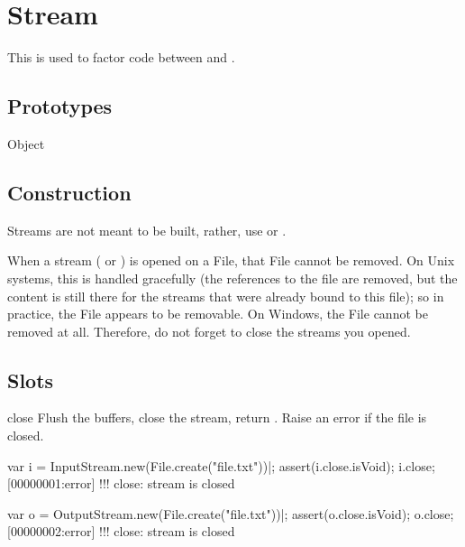 
\section{Stream}

This is used to factor code between  and
.

\subsection{Prototypes}
\begin{refObjects}
\item[Object]
\end{refObjects}

\subsection{Construction}
\label{sec:specs:Stream:ctor}

Streams are not meant to be built, rather, use  or
.

When a stream ( or ) is
opened on a File, that File cannot be removed.  On Unix systems, this is
handled gracefully (the references to the file are removed, but the content
is still there for the streams that were already bound to this file); so in
practice, the File appears to be removable.  On Windows, the File cannot be
removed at all.  Therefore, do not forget to close the streams you opened.

\subsection{Slots}

\begin{urbiscriptapi}
\item[close] Flush the buffers, close the stream, return .
  Raise an error if the file is closed.
\begin{urbiscript}
var i = InputStream.new(File.create("file.txt"))|;
assert(i.close.isVoid);
i.close;
[00000001:error] !!! close: stream is closed

var o = OutputStream.new(File.create("file.txt"))|;
assert(o.close.isVoid);
o.close;
[00000002:error] !!! close: stream is closed
\end{urbiscript}
\end{urbiscriptapi}

